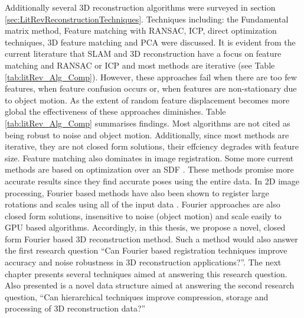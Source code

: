 Additionally several 3D reconstruction algorithms were surveyed in section \ref{sec:LitRevReconstructionTechniques}. Techniques including: the Fundamental matrix method, Feature matching with RANSAC, ICP, direct optimization techniques, 3D feature matching and PCA were discussed. It is evident from the current literature that SLAM and 3D reconstruction have a focus on feature matching and RANSAC or ICP and most methods are iterative (see Table \ref{tab:litRev_Alg_Comp}). However, these approaches fail when there are too few features, when feature confusion occurs or, when features are non-stationary due to object motion. As the extent of random feature displacement becomes more global the effectiveness of these approaches diminishes. Table \ref{tab:litRev_Alg_Comp} summarises findings. Most algorithms are not cited as being robust to noise and object motion. Additionally, since most methods are iterative, they are not closed form solutions, their effciency degrades with feature size. Feature matching also dominates in image registration. Some more current methods are based on optimization over an SDF \cite{Bylow13Real,Rusinkiewicz02Real}. These methods promise more accurate results since they find accurate poses using the entire data. In 2D image processing, Fourier based methods have also been shown to register large rotations and scales using all of the input data \cite{Gonzalez11Improving}. Fourier approaches are also closed form solutions, insensitive to noise (object motion) and scale easily to GPU based algorithms. Accordingly, in this thesis, we propose a novel, closed form Fourier based 3D reconstruction method. Such a method would also answer the first research question ``Can Fourier based registration techniques improve accuracy and noise robustness in 3D reconstruction applications?''. The next chapter presents several techniques aimed at answering this research question. Also presented is a novel data structure aimed at answering the second research question, ``Can hierarchical techniques improve compression, storage and processing of 3D reconstruction data?'' \\
